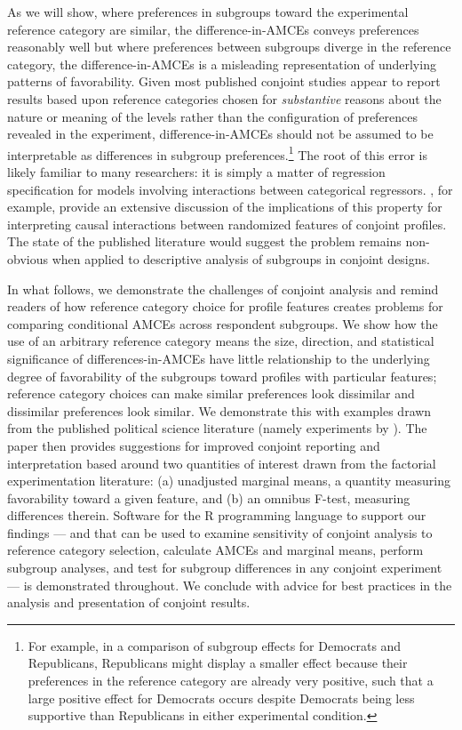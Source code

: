 \documentclass[a4paper,12pt]{article}\usepackage[]{graphicx}\usepackage[]{color}
\begin{document}
As we will show, where preferences in subgroups toward the experimental reference category are similar, the difference-in-AMCEs conveys preferences reasonably well but where preferences between subgroups diverge in the reference category, the difference-in-AMCEs is a misleading representation of underlying patterns of favorability. Given most published conjoint studies appear to report results based upon reference categories chosen for \textit{substantive} reasons about the nature or meaning of the levels rather than the configuration of preferences revealed in the experiment, difference-in-AMCEs should not be assumed to be interpretable as differences in subgroup preferences.\footnote{For example, in a comparison of subgroup effects for Democrats and Republicans, Republicans might display a smaller effect because their preferences in the reference category are already very positive, such that a large positive effect for Democrats occurs despite Democrats being less supportive than Republicans in either experimental condition.} The root of this error is likely familiar to many researchers: it is simply a matter of regression specification for models involving interactions between categorical regressors. \citet{EgamiImai2018}, for example, provide an extensive discussion of the implications of this property for interpreting causal interactions between randomized features of conjoint profiles. The state of the published literature would suggest the problem remains non-obvious when applied to descriptive analysis of subgroups in conjoint designs.

In what follows, we demonstrate the challenges of conjoint analysis and remind readers of how reference category choice for profile features creates problems for comparing conditional AMCEs across respondent subgroups. We show how the use of an arbitrary reference category means the size, direction, and statistical significance of differences-in-AMCEs have little relationship to the underlying degree of favorability of the subgroups toward profiles with particular features; reference category choices can make similar preferences look dissimilar and dissimilar preferences look similar. We demonstrate this with examples drawn from the published political science literature (namely experiments by \citealt{HainmuellerHopkinsYamamoto2014, BechtelScheve2013, TeeleKallaRosenbluth2018}). The paper then provides suggestions for improved conjoint reporting and interpretation based around two quantities of interest drawn from the factorial experimentation literature: (a) unadjusted marginal means, a quantity measuring favorability toward a given feature, and (b) an omnibus F-test, measuring differences therein. Software for the R programming language to support our findings --- and that can be used to examine sensitivity of conjoint analysis to reference category selection, calculate AMCEs and marginal means, perform subgroup analyses, and test for subgroup differences in any conjoint experiment --- is demonstrated throughout. We conclude with advice for best practices in the analysis and presentation of conjoint results.
\end{document}
